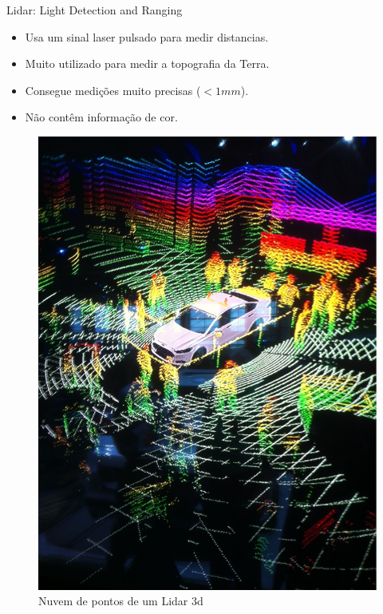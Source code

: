 \begin{frame}{Lidar: Light Detection and Ranging}
						
	\begin{minipage}{0.5\textwidth}
		\begin{itemize}
			\item Usa um sinal laser pulsado para medir distancias.
			\item Muito utilizado para medir a topografia da Terra.
			\item Consegue medições muito precisas ($<1mm$).
			\item Não contêm informação de cor.
		\end{itemize}
	\end{minipage}%
	\begin{minipage}{0.5\textwidth}
		\begin{figure}
			\includegraphics[width=.9\textwidth]{img/lidar.jpg}
			\caption{Nuvem de pontos de um Lidar 3d}
		\end{figure}
	\end{minipage}
																					
\end{frame}

